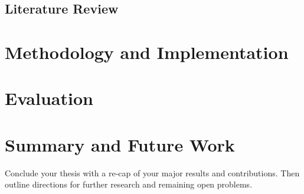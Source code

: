\section{Literature Review}


\chapter{Methodology and Implementation}  
\label{chapter:methodology}


\chapter{Evaluation}  
\label{chapter:evaluation}



\chapter{Summary and Future Work}
\label{chapter:summary}

Conclude your thesis with a re-cap of your major results and contributions.  Then outline directions for further research and remaining open problems.